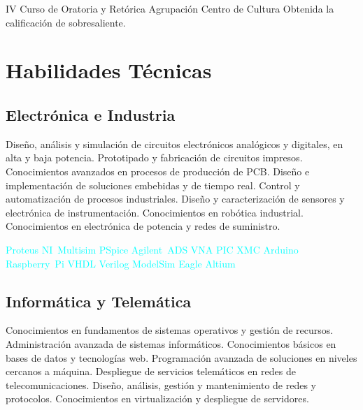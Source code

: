\documentclass[11pt,a4paper,sans,spanish]{moderncv}
\begin{document}
{IV Curso de Oratoria y Retórica}
{Agrupación Centro de Cultura}{}{}
{Obtenida la calificación de sobresaliente.}


\section{Habilidades Técnicas}

\subsection{Electrónica e Industria}
{Diseño, análisis y simulación de circuitos electrónicos analógicos y digitales, en alta y baja potencia.}\quad{}
Prototipado y fabricación de circuitos impresos.\quad{}
{Conocimientos avanzados en procesos de producción de PCB.}\quad{} 
Diseño e implementación de soluciones embebidas y de tiempo real.\quad
{Control y automatización de procesos industriales.}\quad
Diseño y caracterización de sensores y electrónica de instrumentación.\quad
{Conocimientos en robótica industrial.}\quad
{Conocimientos en electrónica de potencia y redes de suministro.}

\begin{center}
\textcolor{cyan}{
Proteus \quad{} NI~Multisim \quad{} PSpice \quad{}
Agilent~ADS \quad{} VNA \quad{}
PIC \quad{} XMC \quad{} Arduino \quad{} Raspberry~Pi \quad{}
VHDL \quad{} Verilog \quad{} ModelSim \quad{}
Eagle \quad{} Altium
}
\end{center}

\subsection{Informática y Telemática}
{Conocimientos en fundamentos de sistemas operativos y gestión de recursos.}\quad
{Administración avanzada de sistemas informáticos.}\quad
{Conocimientos básicos en bases de datos y tecnologías web.}\quad
{Programación avanzada de soluciones en niveles cercanos a máquina.}\quad
{Despliegue de servicios telemáticos en redes de telecomunicaciones. }\quad
{Diseño, análisis, gestión y mantenimiento de redes y protocolos.}\quad
{Conocimientos en virtualización y despliegue de servidores.}\quad
\end{document}
